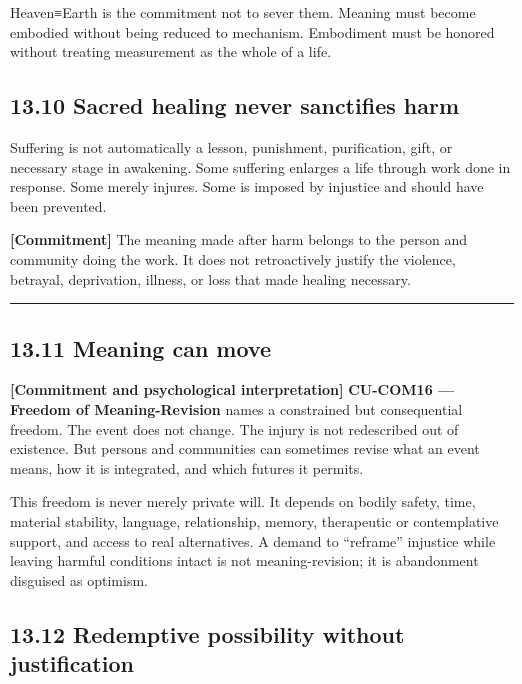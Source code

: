 \documentclass[
  11pt,
]{article}
\begin{document}
Heaven≡Earth is the commitment not to sever them. Meaning must become
embodied without being reduced to mechanism. Embodiment must be honored
without treating measurement as the whole of a life.

\subsection{13.10 Sacred healing never sanctifies
harm}\label{sacred-healing-never-sanctifies-harm}

Suffering is not automatically a lesson, punishment, purification, gift,
or necessary stage in awakening. Some suffering enlarges a life through
work done in response. Some merely injures. Some is imposed by injustice
and should have been prevented.

\textbf{{[}Commitment{]}} The meaning made after harm belongs to the
person and community doing the work. It does not retroactively justify
the violence, betrayal, deprivation, illness, or loss that made healing
necessary.

\begin{center}\rule{0.5\linewidth}{0.5pt}\end{center}

\subsection{13.11 Meaning can move}\label{meaning-can-move}

\textbf{{[}Commitment and psychological interpretation{]}}
\textbf{CU-COM16 --- Freedom of Meaning-Revision} names a constrained
but consequential freedom. The event does not change. The injury is not
redescribed out of existence. But persons and communities can sometimes
revise what an event means, how it is integrated, and which futures it
permits.

This freedom is never merely private will. It depends on bodily safety,
time, material stability, language, relationship, memory, therapeutic or
contemplative support, and access to real alternatives. A demand to
``reframe'' injustice while leaving harmful conditions intact is not
meaning-revision; it is abandonment disguised as optimism.

\subsection{13.12 Redemptive possibility without
justification}\label{redemptive-possibility-without-justification}
\end{document}
